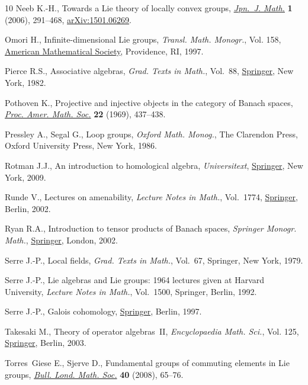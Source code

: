 \begin{thebibliography}{10}
Neeb K.-H., Towards a {L}ie theory of locally convex groups, \href{https://doi.org/10.1007/s11537-006-0606-y}{\textit{Jpn.~J.
 Math.}} \textbf{1} (2006), 291--468, \href{https://arxiv.org/abs/1501.06269}{arXiv:1501.06269}.

Omori H., Infinite-dimensional {L}ie groups, \textit{Transl. Math. Monogr.},
 Vol. 158, \href{https://doi.org/10.1090/mmono/158}{American Mathematical Society}, Providence, RI, 1997.

Pierce R.S., Associative algebras, \textit{Grad. Texts in Math.}, Vol.~88,
 \href{https://doi.org/10.1007/978-1-4757-0163-0}{Springer}, New York, 1982.

Pothoven K., Projective and injective objects in the category of {B}anach
 spaces, \href{https://doi.org/10.2307/2037073}{\textit{Proc. Amer. Math. Soc.}} \textbf{22} (1969), 437--438.

Pressley A., Segal G., Loop groups, \textit{Oxford Math. Monog.}, The Clarendon Press,
 Oxford University Press, New York, 1986.

Rotman J.J., An introduction to homological algebra, \textit{Universitext}, \href{https://doi.org/10.1007/b98977}{Springer},
 New York, 2009.

Runde V., Lectures on amenability, \textit{Lecture Notes in Math.}, Vol.~1774,
 \href{https://doi.org/10.1007/b82937}{Springer}, Berlin, 2002.

Ryan R.A., Introduction to tensor products of {B}anach spaces, \textit{Springer Monogr.
 Math.}, \href{https://doi.org/10.1007/978-1-4471-3903-4}{Springer}, London, 2002.

Serre J.-P., Local fields, \textit{Grad. Texts in Math.}, Vol.~67, Springer, New
 York, 1979.

Serre J.-P., Lie algebras and {L}ie groups: 1964 lectures given at {H}arvard
 {U}niversity, \textit{Lecture Notes in Math.}, Vol.~1500, Springer, Berlin,
 1992.

Serre J.-P., Galois cohomology, \href{https://doi.org/10.1007/978-3-642-59141-9}{Springer}, Berlin, 1997.

Takesaki M., Theory of operator algebras~{II}, \textit{Encyclopaedia Math.
 Sci.}, Vol. 125, \href{https://doi.org/10.1007/978-3-662-10451-4}{Springer}, Berlin, 2003.

Torres~Giese E., Sjerve D., Fundamental groups of commuting elements in {L}ie
 groups, \href{https://doi.org/10.1112/blms/bdm094}{\textit{Bull. Lond. Math. Soc.}} \textbf{40} (2008), 65--76.


\end{thebibliography}
